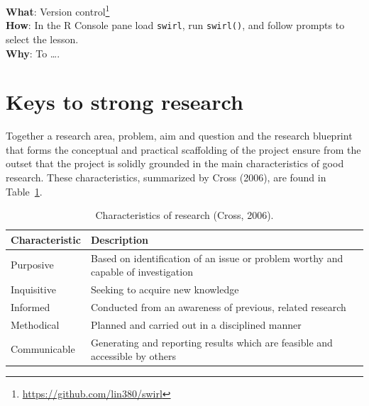 \documentclass[
  letterpaper,
]{scrbook}
\DeclareRobustCommand{\href}[2]{#2\footnote{\url{#1}}}
\begin{document}
\begin{tcolorbox}[enhanced jigsaw, title=\textcolor{quarto-callout-tip-color}{\faLightbulb}\hspace{0.5em}{Interactive programming}, breakable, colback=white, colframe=quarto-callout-tip-color-frame, bottomrule=.15mm, left=2mm, bottomtitle=1mm, colbacktitle=quarto-callout-tip-color!10!white, opacityback=0, arc=.35mm, toprule=.15mm, coltitle=black, leftrule=.75mm, opacitybacktitle=0.6, toptitle=1mm, titlerule=0mm, rightrule=.15mm]

\textbf{What}: \href{https://github.com/lin380/swirl}{Version control}\\
\textbf{How}: In the R Console pane load \texttt{swirl}, run
\texttt{swirl()}, and follow prompts to select the lesson.\\
\textbf{Why}: To \ldots.

\end{tcolorbox}

\hypertarget{keys-to-strong-research}{%
\section{Keys to strong research}\label{keys-to-strong-research}}

Together a research area, problem, aim and question and the research
blueprint that forms the conceptual and practical scaffolding of the
project ensure from the outset that the project is solidly grounded in
the main characteristics of good research. These characteristics,
summarized by Cross (2006), are found in
Table~\ref{tbl-fr-cross-research-char-table}.

\hypertarget{tbl-fr-cross-research-char-table}{}
\begin{table}
\caption{\label{tbl-fr-cross-research-char-table}Characteristics of research (Cross, 2006). }\tabularnewline

\centering
\begin{tabular}{ll}
\toprule
Characteristic & Description\\
\midrule
Purposive & Based on identification of an issue or problem worthy and capable of investigation\\
Inquisitive & Seeking to acquire new knowledge\\
Informed & Conducted from an awareness of previous, related research\\
Methodical & Planned and carried out in a disciplined manner\\
Communicable & Generating and reporting results which are feasible and accessible by others\\
\bottomrule
\end{tabular}
\end{table}
\end{document}

